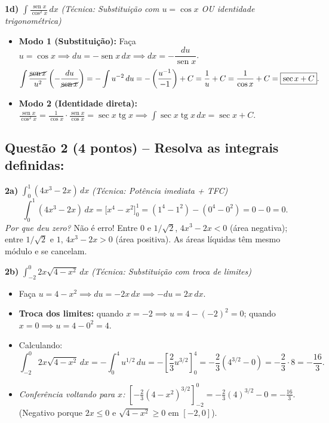 \documentclass[10pt,a4paper]{article}
\DeclareMathOperator{\sen}{sen}
\DeclareMathOperator{\tg}{tg}
\begin{document}
\medskip
\textbf{1d)} $\displaystyle \int \frac{\sen x}{\cos^2 x}\,dx$ \quad \textit{(Técnica: Substituição com $u = \cos x$ OU identidade trigonométrica)}
\begin{itemize}
    \item \textbf{Modo 1 (Substituição):} Faça $u = \cos x \implies du = -\sen x\,dx \implies dx = -\dfrac{du}{\sen x}$.
          \[
              \int \frac{\cancel{\sen x}}{u^2}\left(-\frac{du}{\cancel{\sen x}}\right) = -\int u^{-2}\,du = -\left(\frac{u^{-1}}{-1}\right) + C = \frac{1}{u} + C = \frac{1}{\cos x} + C = \boxed{\sec x + C}.
          \]
    \item \textbf{Modo 2 (Identidade direta):} $\displaystyle \frac{\sen x}{\cos^2 x} = \frac{1}{\cos x}\cdot\frac{\sen x}{\cos x} = \sec x \tg x \implies \int \sec x \tg x\,dx = \boxed{\sec x + C}$.
\end{itemize}

\subsection*{Questão 2 (4 pontos) -- Resolva as integrais definidas:}

\textbf{2a)} $\displaystyle \int_{0}^{1} (4x^3 - 2x)\,dx$ \quad \textit{(Técnica: Potência imediata + TFC)}
\[
    \int_{0}^{1} (4x^3 - 2x)\,dx = \Big[ x^4 - x^2 \Big]_{0}^{1} = (1^4 - 1^2) - (0^4 - 0^2) = 0 - 0 = \boxed{0}.
\]
\textit{Por que deu zero?} Não é erro! Entre $0$ e $1/\sqrt{2}$, $4x^3 - 2x < 0$ (área negativa); entre $1/\sqrt{2}$ e $1$, $4x^3 - 2x > 0$ (área positiva). As áreas líquidas têm mesmo módulo e se cancelam.

\medskip
\textbf{2b)} $\displaystyle \int_{-2}^{0} 2x\sqrt{4 - x^2}\,dx$ \quad \textit{(Técnica: Substituição com troca de limites)}
\begin{itemize}
    \item Faça $u = 4 - x^2 \implies du = -2x\,dx \implies -du = 2x\,dx$.
    \item \textbf{Troca dos limites:} quando $x = -2 \implies u = 4 - (-2)^2 = 0$; \quad quando $x = 0 \implies u = 4 - 0^2 = 4$.
    \item Calculando:
          \[
              \int_{-2}^{0} 2x\sqrt{4-x^2}\,dx = -\int_{0}^{4} u^{1/2}\,du = -\left[\frac{2}{3}u^{3/2}\right]_{0}^{4} = -\frac{2}{3}\left(4^{3/2} - 0\right) = -\frac{2}{3}\cdot 8 = \boxed{-\frac{16}{3}}.
          \]
    \item \textit{Conferência voltando para $x$:} $\displaystyle \left[-\frac{2}{3}(4-x^2)^{3/2}\right]_{-2}^{0} = -\frac{2}{3}(4)^{3/2} - 0 = -\frac{16}{3}$. (Negativo porque $2x \le 0$ e $\sqrt{4-x^2} \ge 0$ em $[-2,0]$).
\end{itemize}
\end{document}
